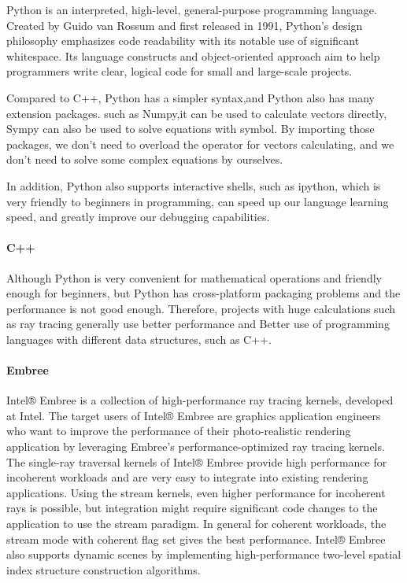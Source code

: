\documentclass[conference]{IEEEtran}
\begin{document}
Python is an interpreted, high-level, general-purpose programming language. 
Created by Guido van Rossum and first released in 1991, Python's design philosophy emphasizes code readability with its notable use of significant whitespace. 
Its language constructs and object-oriented approach aim to help programmers write clear, logical code for small and large-scale projects.\cite{python1}

Compared to C++, Python has a simpler syntax,and Python also has many extension packages. such as Numpy,it can be used to calculate vectors directly,
Sympy can also be used to solve equations with symbol. By importing those packages, we don't need to overload the operator for vectors calculating, and we don't need to
solve some complex equations by ourselves.

In addition, Python also supports interactive shells, such as ipython, which is very friendly to beginners in programming, 
can speed up our language learning speed, and greatly improve our debugging capabilities.

\paragraph{C++}
Although Python is very convenient for mathematical operations and friendly enough for beginners, but
Python has cross-platform packaging problems and the performance is not good enough. 
Therefore, projects with huge calculations such as ray tracing generally use better performance 
and Better use of programming languages with different data structures, such as C++.

\paragraph{Embree}
Intel® Embree is a collection of high-performance ray tracing kernels, developed at Intel. 
The target users of Intel® Embree are graphics application engineers who want to improve the 
performance of their photo-realistic rendering application by leveraging Embree's performance-optimized ray tracing kernels. 
The single-ray traversal kernels of Intel® Embree provide high performance for incoherent workloads and are very easy to integrate into existing rendering applications.
Using the stream kernels, even higher performance for incoherent rays is possible, but integration might require significant code changes to the application to use the stream paradigm. 
In general for coherent workloads, the stream mode with coherent flag set gives the best performance.
Intel® Embree also supports dynamic scenes by implementing high-performance two-level spatial index structure construction algorithms. \cite{Intel_Embree}
\end{document}
